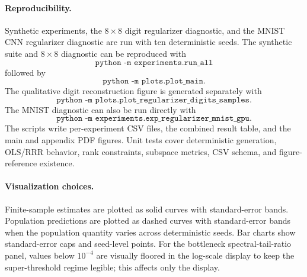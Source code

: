 

\paragraph{Reproducibility.}
Synthetic experiments, the $8\times8$ digit regularizer diagnostic, and the
MNIST CNN regularizer diagnostic are run with ten deterministic seeds. The
synthetic suite and $8\times8$ diagnostic can be reproduced
with
\[
    \texttt{python -m experiments.run\_all}
\]
followed by
\[
    \texttt{python -m plots.plot\_main}.
\]
The qualitative digit reconstruction figure is generated separately with
\[
    \texttt{python -m plots.plot\_regularizer\_digits\_samples}.
\]
The MNIST diagnostic can also be run directly with
\[
    \texttt{python -m experiments.exp\_regularizer\_mnist\_gpu}.
\]
The scripts write per-experiment CSV files, the combined result table, and the
main and appendix PDF figures. Unit tests cover deterministic generation,
OLS/RRR behavior, rank constraints, subspace metrics, CSV schema, and
figure-reference existence.

\paragraph{Visualization choices.}
Finite-sample estimates are plotted as solid curves with standard-error bands.
Population predictions are plotted as dashed curves with standard-error bands
when the population quantity varies across deterministic seeds. Bar charts show
standard-error caps and seed-level points.
For the bottleneck spectral-tail-ratio panel, values below $10^{-4}$ are
visually floored in the log-scale display to keep the super-threshold regime
legible; this affects only the display.

